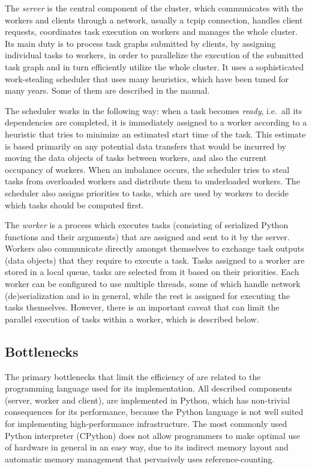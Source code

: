 The \emph{server} is the central component of the cluster, which communicates with
the workers and clients through a network, usually a \gls{tcpip} connection,
handles client requests, coordinates task execution on workers and manages the whole
\dask{} cluster. Its main duty is to process task graphs submitted by clients,
by assigning individual tasks to workers, in order to parallelize the execution of the submitted
task graph and in turn efficiently utilize the whole cluster. It uses a sophisticated work-stealing
scheduler that uses many heuristics, which have been tuned for many years. Some of them are
described in the \dask{} manual.

The scheduler works in the following way: when a task becomes \emph{ready}, i.e.\
all its dependencies are completed, it is immediately assigned to a worker according to a heuristic
that tries to minimize an estimated start time of the task. This estimate is based primarily on any
potential data transfers that would be incurred by moving the data objects of tasks between
workers, and also the current occupancy of workers. When an imbalance occurs, the scheduler tries
to steal tasks from overloaded workers and distribute them to underloaded workers. The scheduler
also assigns priorities to tasks, which are used by workers to decide which tasks should be
computed first.

The \emph{worker} is a process which executes tasks (consisting of serialized Python
functions and their arguments) that are assigned and sent to it by the server. Workers also
communicate directly amongst themselves to exchange task outputs (data objects) that they require
to execute a task. Tasks assigned to a worker are stored in a local queue, tasks are selected from
it based on their priorities. Each worker can be configured to use multiple threads, some of which
handle network (de)serialization and \gls{io} in general, while the rest is
assigned for executing the tasks themselves. However, there is an important caveat that can limit
the parallel execution of tasks within a worker, which is described below.

\subsection*{Bottlenecks}
The primary bottlenecks that limit the efficiency of \dask{} are related to the
programming language used for its implementation. All described components (server, worker and
client), are implemented in Python, which has non-trivial consequences for its performance, because
the Python language is not well suited for implementing high-performance infrastructure. The most
commonly used Python interpreter (CPython\footnoteurl{https://github.com/python/cpython}) does not allow programmers to
make optimal use of hardware in general in an easy way, due to its indirect memory layout and
automatic memory management that pervasively uses reference-counting.

